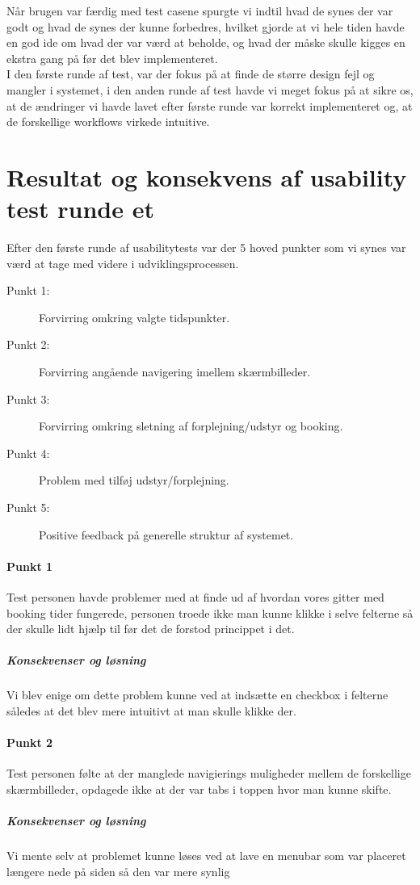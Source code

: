 Når brugen var færdig med test casene spurgte vi indtil hvad de synes der var godt og hvad de synes der kunne forbedres, hvilket gjorde at vi hele tiden havde en god ide om hvad der var værd at beholde, og hvad der måske skulle kigges en ekstra gang på før det blev implementeret.\\ I den første runde af test, var der fokus på at finde de større design fejl og mangler i systemet,  i den anden runde af test havde vi meget fokus på at sikre os, at de ændringer vi havde lavet efter første runde var korrekt implementeret og, at de forskellige workflows virkede intuitive.

\section{Resultat og konsekvens af usability test runde et }
\label{Res_kon_usability_1}
Efter den første runde af usabilitytests var der 5 hoved punkter som vi synes var værd at tage med videre i udviklingsprocessen.
\begin{description}
\item [Punkt 1:] Forvirring omkring valgte tidspunkter.
\item [Punkt 2:] Forvirring angående navigering imellem skærmbilleder.
\item [Punkt 3:] Forvirring omkring sletning af forplejning/udstyr og booking.
\item [Punkt 4:] Problem med tilføj udstyr/forplejning.
\item [Punkt 5:] Positive feedback på generelle struktur af systemet.
\end{description}

\paragraph{Punkt 1}
Test personen havde problemer med at finde ud af hvordan vores gitter med booking tider fungerede, personen troede ikke man kunne klikke i selve felterne så der skulle lidt hjælp til før det de forstod princippet i det.
\subparagraph{Konsekvenser og løsning}
Vi blev enige om dette problem kunne ved at indsætte en checkbox i felterne således at det blev mere intuitivt at man skulle klikke der.

\paragraph{Punkt 2}
Test personen følte at der manglede navigierings muligheder mellem de forskellige skærmbilleder, opdagede ikke at der var tabs i toppen hvor man kunne skifte.
\subparagraph{Konsekvenser og løsning}
Vi mente selv at problemet kunne løses ved at lave en menubar som var placeret længere nede på siden så den var mere synlig

